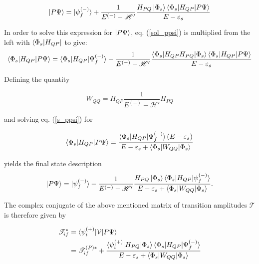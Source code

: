 \begin{equation}\label{sol_ppsi}
  \ket{P \Psi} = \ket{\psi_f^{(-)}} + \frac{1}{E^{(-)} - \mathscr{H}'}
           \frac{H_{PQ}\ket{\Phi_s}
           \braket{\Phi_s|H_{QP}|P\Psi}}{E - \varepsilon_s} 
\end{equation}

In order to solve this expression for $\ket{P \Psi}$,
eq. (\ref{sol_ppsi})
is multiplied from the left with $\bra{\Phi_s|H_{QP}}$ to give:
\begin{equation}
  \braket{\Phi_s|H_{QP}|P\Psi} = \braket{\Phi_s|H_{QP}|\Psi_f^{(-)}} -
  \frac{1}{E^{(-)} - \mathscr{H}'}
  \frac{\braket{\Phi_s|H_{QP}H_{PQ}|\Phi_s} \braket{\Phi_s|H_{QP}|P\Psi}}
       {E - \varepsilon_s}  \label{s_ppsi} 
\end {equation}

Defining the quantity

\begin{equation}
  W_{QQ} = H_{QP}\frac{1}{E^{(-)} - \mathscr{H}'}H_{PQ}
\end{equation}

and solving eq. (\ref{s_ppsi}) for

\begin{equation}
  \braket{\Phi_s|H_{QP}|P\Psi} = \frac{\braket{\Phi_s|H_{QP}|\Psi_f^{(-)}}(E-\varepsilon_s)}
{E - \varepsilon_s + \braket{\Phi_s|W_{QQ}|\Phi_s}}
\end{equation}

yields the final state description
\begin{equation}\label{}
  \ket{P \Psi} = \ket{\psi_f^{(-)}} - \frac{1}{E^{(-)} - \mathscr{H}'}
           \frac{H_{PQ}\ket{\Phi_s}
           \braket{\Phi_s|H_{QP}|\psi_f^{(-)}}}
           {E - \varepsilon_s + \braket{\Phi_s|W_{QQ}|\Phi_s}} .
\end{equation}



The complex conjugate of the above mentioned matrix of transition
amplitudes $\mathcal{T}$
is therefore given by


\begin{align}
  \mathscr{T}_{if}^* &= \braket{\psi_i^{(+)}| \mathcal{V} | P\Psi} \\
                   &= \mathscr{T}_{if}^{(P)*} + 
                     \frac{\braket{\psi_i^{(+)}|H_{PQ}|\Phi_s}
                           \braket{\Phi_s|H_{QP}|\Psi_f^{(-)}}}
                          {E-\varepsilon_s + \braket{\Phi_s|W_{QQ}|\Phi_s}}
\end{align}

